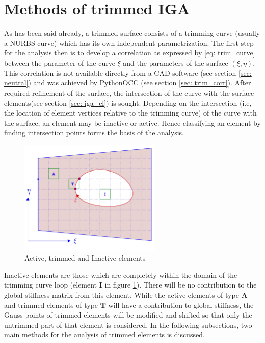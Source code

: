 \documentclass[12pt, a4paper]{report}
\begin{document}
\section{Methods of trimmed IGA}\label{subsection: methods_trim_iga}
As has been said already, a trimmed surface consists of a trimming curve (usually a NURBS curve) which has its own independent parametrization. The first step for the analysis then is to develop a correlation as expressed by \eqref{eq: trim_curve} between the parameter of the curve $\tilde{\xi}$ and the parameters of the surface $(\xi, \eta)$. This correlation is not available directly from a CAD software (see section \ref{sec: neutral}) and was achieved by PythonOCC (see section \ref{sec: trim_corr}). After required refinement of the surface, the intersection of the curve with the surface elements(see section \ref{sec: iga_el}) is sought. Depending on the intersection (i.e, the location of element vertices relative to the trimming curve) of the curve with the surface, an element may be inactive or active. Hence classifying an element by finding intersection points forms the basis of the analysis.
\begin{figure}[H]
\centering
\includegraphics[width=0.6\textwidth]{Images/trim_active.jpg}
\caption{Active, trimmed and Inactive elements}
\label{fig:trim_el_type}
\end{figure}
\par Inactive elements are those which are completely within the domain of the trimming curve loop (element $\mathbf{I}$ in figure \ref{fig:trim_el_type}). There will be no contribution to the global stiffness matrix from this element. While the active elements of type $\mathbf{A}$ and trimmed elements 
 of type $\mathbf{T}$ will have a contribution to global stiffness, the Gauss points of trimmed elements will be modified and shifted so that only the untrimmed part of that element is considered. In the following subsections, two main methods for the analysis of trimmed elements is discussed.
 
\end{document}
